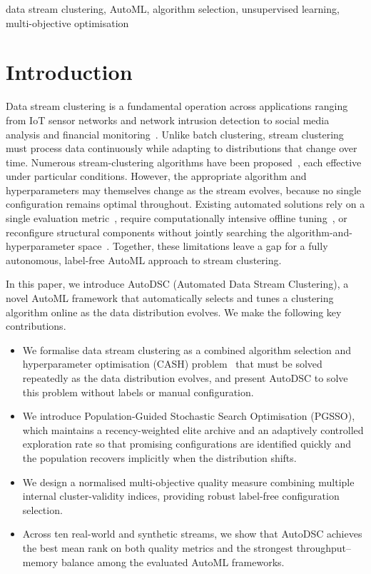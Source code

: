 \documentclass[conference]{IEEEtran}
\begin{document}
\begin{IEEEkeywords}
data stream clustering, AutoML, algorithm selection, unsupervised learning, multi-objective optimisation
\end{IEEEkeywords}

\section{Introduction}
Data stream clustering is a fundamental operation across applications ranging from IoT sensor networks and network intrusion detection to social media analysis and financial monitoring~\cite{yang2022iot,bahri2021data}. Unlike batch clustering, stream clustering must process data continuously while adapting to distributions that change over time. Numerous stream-clustering algorithms have been proposed~\cite{aggarwal2003framework,Cao2006,Hahsler2016,montiel2021river}, each effective under particular conditions. However, the appropriate algorithm and hyperparameters may themselves change as the stream evolves, because no single configuration remains optimal throughout. Existing automated solutions rely on a single evaluation metric~\cite{carnein2020confstream}, require computationally intensive offline tuning~\cite{el2023onlineautoclust}, or reconfigure structural components without jointly searching the algorithm-and-hyperparameter space~\cite{wang2024mostream}. Together, these limitations leave a gap for a fully autonomous, label-free AutoML approach to stream clustering.

In this paper, we introduce AutoDSC (Automated Data Stream Clustering), a novel AutoML framework that automatically selects and tunes a clustering algorithm online as the data distribution evolves. We make the following key contributions.

\begin{itemize}
    \item We formalise data stream clustering as a combined algorithm selection and hyperparameter optimisation (CASH) problem~\cite{hutter2019automated} that must be solved repeatedly as the data distribution evolves, and present AutoDSC to solve this problem without labels or manual configuration.
    \item We introduce Population-Guided Stochastic Search Optimisation (PGSSO), which maintains a recency-weighted elite archive and an adaptively controlled exploration rate so that promising configurations are identified quickly and the population recovers implicitly when the distribution shifts.
    \item We design a normalised multi-objective quality measure combining multiple internal cluster-validity indices, providing robust label-free configuration selection.
    \item Across ten real-world and synthetic streams, we show that AutoDSC achieves the best mean rank on both quality metrics and the strongest throughput--memory balance among the evaluated AutoML frameworks.
\end{itemize}
\end{document}
